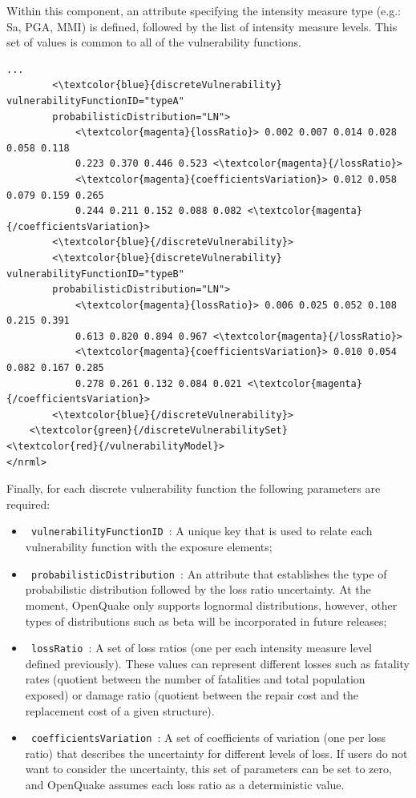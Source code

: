Within this component, an attribute specifying the intensity measure type (e.g.: Sa, PGA, MMI) is defined, followed by the list of intensity measure levels. This set of values is common to all of the vulnerability functions.

\begin{Verbatim}[frame=single, commandchars=\\\{\}, samepage=true]
        ...
        <\textcolor{blue}{discreteVulnerability}  vulnerabilityFunctionID="typeA" 
        probabilisticDistribution="LN">
            <\textcolor{magenta}{lossRatio}> 0.002 0.007 0.014 0.028 0.058 0.118
            0.223 0.370 0.446 0.523 <\textcolor{magenta}{/lossRatio}>
            <\textcolor{magenta}{coefficientsVariation}> 0.012 0.058 0.079 0.159 0.265 
            0.244 0.211 0.152 0.088 0.082 <\textcolor{magenta}{/coefficientsVariation}>
        <\textcolor{blue}{/discreteVulnerability}>
        <\textcolor{blue}{discreteVulnerability}  vulnerabilityFunctionID="typeB" 
        probabilisticDistribution="LN">
            <\textcolor{magenta}{lossRatio}> 0.006 0.025 0.052 0.108 0.215 0.391	
            0.613 0.820 0.894 0.967 <\textcolor{magenta}{/lossRatio}>
            <\textcolor{magenta}{coefficientsVariation}> 0.010 0.054 0.082 0.167 0.285 
            0.278 0.261 0.132 0.084 0.021 <\textcolor{magenta}{/coefficientsVariation}>
        <\textcolor{blue}{/discreteVulnerability}>
    <\textcolor{green}{/discreteVulnerabilitySet} 
<\textcolor{red}{/vulnerabilityModel}>        
</nrml>
\end{Verbatim}

Finally, for each discrete vulnerability function the following parameters are required:
\begin{itemize}
\item  \Verb+ vulnerabilityFunctionID +: A unique key that is used to relate each vulnerability function with the exposure elements;
\item  \Verb+ probabilisticDistribution +: An attribute that establishes the type of probabilistic distribution followed by the loss ratio uncertainty. At the moment, OpenQuake only supports lognormal distributions, however, other types of distributions such as beta will be incorporated in future releases;
\item  \Verb+ lossRatio +: A set of loss ratios (one per each intensity measure level defined previously). These values can represent different losses such as fatality rates (quotient between the number of fatalities and total population exposed) or damage ratio (quotient between the repair cost and the replacement cost of a given structure).
\item  \Verb+ coefficientsVariation +: A set of coefficients of variation (one per loss ratio) that describes the uncertainty for different levels of loss. If users do not want to consider the uncertainty, this set of parameters can be set to zero, and OpenQuake assumes each loss ratio as a deterministic value. 
\end{itemize}

